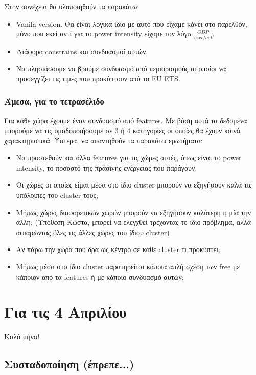 \documentclass[a4paper,twoside,10pt]{article}
\begin{document}
Στην συνέχεια θα υλοποιηθούν τα παρακάτω:
\begin{itemize}
	\item Vanila version. Θα είναι λογικά ίδιο με αυτό που είχαμε κάνει στο παρελθόν, μόνο που εκεί αντί για το power intensity είχαμε τον λόγo $\frac{GDP}{verified}$.
	\item Διάφορα constrains και συνδυασμοί αυτών. 
	\item Να πλησιάσουμε να βρούμε συνδυασμό από περιορισμούς οι οποίοι να προσεγγίζει τις τιμές που προκύπτουν από το EU ETS.
	
\end{itemize}

\subsubsection{Άμεσα, για το τετρασέλιδο}
Για κάθε χώρα έχουμε έναν συνδυασμό από  features. Με βάση αυτά τα δεδομένα μπορούμε να τις ομαδοποιήσουμε σε 3 ή 4 κατηγορίες οι οποίες θα έχουν κοινά χαρακτηριστικά. Ύστερα, να απαντηθούν τα παρακάτω ερωτήματα:
\begin{itemize}
	\item Να προστεθούν και άλλα features για τις χώρες αυτές, όπως είναι το power intensity, το ποσοστό της πράσινης ενέργειας που παράγουν.
	\item Οι χώρες οι οποίες είμαι μέσα στο ίδιο cluster μπορούν να εξηγήσουν καλά τις υπόλοιπες του cluster τους;
	\item Μήπως χώρες διαφορετικών χωρών μπορούν να εξηγήσουν καλύτερη η μία την άλλη; (Υπόθεση Κώστα, μπορεί να ελεγχθεί τρέχοντας το ίδιο πρόβλημα, αλλά αφιαρώντας όλες τις άλλες χώρες του ίδιου cluster)
	\item Αν πάρω την χώρα που δρα ως κέντρο σε κάθε cluster τι προκύπτει;
	\item Μήπως μέσα στο ίδιο cluster παρατηρείται κάποια απλή σχέση των free με κάποιον από τα features ή με κάποιο συνδυασμό αυτών; 
\end{itemize}
\section{Για τις 4 Απριλίου}
Καλό μήνα!
\subsection{Συσταδοποίηση (έπρεπε...)}
\end{document}
